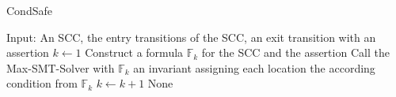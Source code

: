 \begin{algorithm}
\caption{CondSafe}\label{condsafe}
\begin{spacing}{2}
\begin{algorithmic}[1]
\fontsize{14}{14}\selectfont
\State Input: An SCC, the entry transitions of the SCC, an exit transition with an assertion
\State $k \gets 1$
\Repeat
  \State Construct a formula $\mathbb{F}_k$ for the SCC and the assertion
  \State Call the Max-SMT-Solver with $\mathbb{F}_k$
    \Return an invariant assigning each location the according condition from $\mathbb{F}_k$
  \EndIf
  \State $k \gets k + 1$
\Return None
\end{algorithmic}
\end{spacing}
\end{algorithm}
